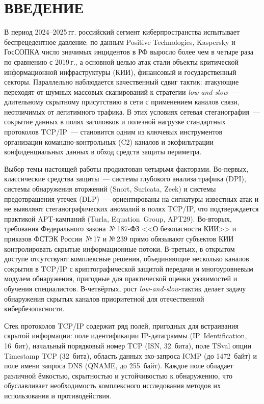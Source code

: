 \section*{ВВЕДЕНИЕ}

В период 2024--2025\,гг. российский сегмент киберпространства
испытывает беспрецедентное давление: по данным Positive Technologies,
Kaspersky и ГосСОПКА число значимых инцидентов в РФ выросло
более чем в четыре раза по сравнению с 2019\,г., а основной целью
атак стали объекты критической информационной инфраструктуры (КИИ),
финансовый и государственный секторы. Параллельно наблюдается
качественный сдвиг тактик: атакующие переходят от шумных массовых
сканирований к стратегии \textit{low-and-slow}~--- длительному скрытному
присутствию в сети с применением каналов связи, неотличимых от
легитимного трафика. В этих условиях сетевая стеганография~---
сокрытие данных в полях заголовков и полезной нагрузке стандартных
протоколов TCP/IP~--- становится одним из ключевых инструментов
организации командно-контрольных (C2) каналов и эксфильтрации
конфиденциальных данных в обход средств защиты периметра.

Выбор темы настоящей работы продиктован четырьмя факторами.
Во-первых, классические средства защиты~--- системы глубокого
анализа трафика (DPI), системы обнаружения вторжений (Snort,
Suricata, Zeek) и системы предотвращения утечек (DLP)~--- ориентированы
на сигнатуры известных атак и не выявляют стеганографических
аномалий в полях TCP/IP, что подтверждается практикой APT-кампаний
(Turla, Equation~Group, APT29). Во-вторых, требования Федерального
закона~№\,187-ФЗ <<О безопасности КИИ>> и приказов ФСТЭК
России~№\,17 и №\,239 прямо обязывают субъектов КИИ контролировать
скрытые информационные потоки. В-третьих, в открытом доступе
отсутствуют комплексные решения, объединяющие несколько каналов
сокрытия в TCP/IP с криптографической защитой передачи и
многоуровневым модулем обнаружения, пригодные для практической
оценки уязвимостей и обучения специалистов. В-четвёртых, рост
\textit{low-and-slow}-тактик делает задачу обнаружения скрытых
каналов приоритетной для отечественной кибербезопасности.

Стек протоколов TCP/IP содержит ряд полей, пригодных для
встраивания скрытой информации: поле идентификации IP-датаграммы
(IP~Identification, 16~бит), начальный порядковый номер TCP
(ISN, 32~бита), поле TSval опции Timestamp TCP (32~бита), область
данных эхо-запроса ICMP (до 1472~байт) и поле имени запроса DNS
(QNAME, до 255~байт). Каждое поле обладает различной ёмкостью,
скрытностью и устойчивостью к обнаружению, что обуславливает
необходимость комплексного исследования методов их использования и
противодействия.

